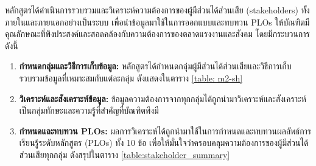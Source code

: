 \begin{doclist}
\docitem{\printprogram{} }
\end{doclist}




หลักสูตรได้ดำเนินการรวบรวมและวิเคราะห์ความต้องการของผู้มีส่วนได้ส่วนเสีย (stakeholders) ทั้งภายในและภายนอกอย่างเป็นระบบ เพื่อนำข้อมูลมาใช้ในการออกแบบและทบทวน PLOs ให้บัณฑิตมีคุณลักษณะที่พึงประสงค์และสอดคล้องกับความต้องการของตลาดแรงงานและสังคม โดยมีกระบวนการดังนี้

\begin{enumerate}
    \item \textbf{กำหนดกลุ่มและวิธีการเก็บข้อมูล:} หลักสูตรได้กำหนดกลุ่มผู้มีส่วนได้ส่วนเสียและวิธีการเก็บรวบรวมข้อมูลที่เหมาะสมกับแต่ละกลุ่ม ดังแสดงในตาราง \ref{table: m2-sh}
    
    \item \textbf{วิเคราะห์และสังเคราะห์ข้อมูล:} ข้อมูลความต้องการจากทุกกลุ่มได้ถูกนำมาวิเคราะห์และสังเคราะห์เป็นกลุ่มทักษะและความรู้ที่สำคัญที่บัณฑิตพึงมี
    
    \item \textbf{กำหนดและทบทวน PLOs:} ผลการวิเคราะห์ได้ถูกนำมาใช้ในการกำหนดและทบทวนผลลัพธ์การเรียนรู้ระดับหลักสูตร (PLOs) ทั้ง 10 ข้อ เพื่อให้มั่นใจว่าครอบคลุมความต้องการของผู้มีส่วนได้ส่วนเสียทุกกลุ่ม ดังสรุปในตาราง \ref{table:stakeholder_summary}
\end{enumerate}

